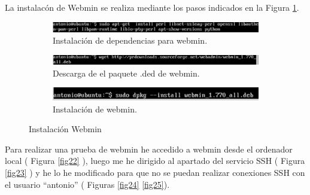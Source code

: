 La instalacón de Webmin se realiza mediante los pasos indicados en la Figura \ref{fig21}. \cite{webmin}
\begin{figure}[H]
    \centering
    \begin{subfigure}[b]{1\textwidth}
        \includegraphics[width=\textwidth]{imagenes/img22.eps}
        \caption{Instalación de dependencias para webmin.}
    \end{subfigure}
    
        \begin{subfigure}[b]{1\textwidth}
        \includegraphics[width=\textwidth]{imagenes/img23.eps}
        \caption{Descarga de el paquete .ded de webmin.}
    \end{subfigure}
    
        \begin{subfigure}[b]{1\textwidth}
        \includegraphics[width=\textwidth]{imagenes/img24.eps}
        \caption{Instalación de webmin.}
    \end{subfigure}
    \caption{Instalación Webmin}
     \label{fig21} 
\end{figure}

Para realizar una prueba de webmin he accedido a webmin desde el ordenador local ( Figura \ref{fig22} ), luego me he dirigido al apartado del servicio SSH ( Figura \ref{fig23} ) y he lo he modificado para que no se puedan realizar conexiones SSH con el usuario ``antonio'' ( Figuras \ref{fig24} \ref{fig25}).



